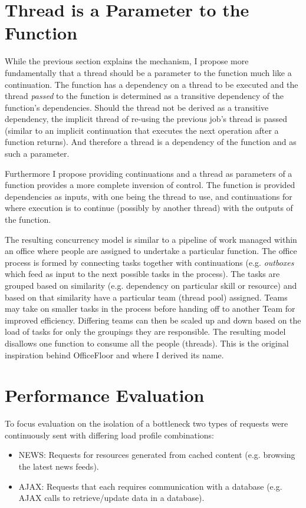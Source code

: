 \documentclass[conference]{ieee/IEEEtran}
\begin{document}
\section{Thread is a Parameter to the Function}
While the previous section explains the mechanism, I propose more fundamentally
that a thread should be a parameter to the function much like a continuation. 
The function has a dependency on a thread to be executed and the thread
\textit{passed} to the function is determined as a transitive dependency of the
function's dependencies.  Should the thread not be derived as a transitive
dependency, the implicit thread of re-using the previous job's thread is passed
(similar to an implicit continuation that executes the next operation after a
function returns).  And therefore a thread is a dependency of the function and
as such a parameter.

Furthermore I propose providing continuations and a thread as parameters of a
function provides a more complete inversion of control.  The function is
provided dependencies as inputs, with one being the thread to use, and
continuations for where execution is to continue (possibly by another thread)
with the outputs of the function.

The resulting concurrency model is similar to a pipeline of work managed within
an office where people are assigned to undertake a particular function.
The office process is formed by connecting tasks together with continuations
(e.g. \textit{outboxes} which feed as input to the next possible tasks in the
process).  The tasks are grouped based on similarity (e.g. dependency on
particular skill or resource) and based on that similarity have a particular
team (thread pool) assigned.  Teams may take on smaller tasks in the process
before handing off to another Team for improved efficiency.  Differing teams can
then be scaled up and down based on the load of tasks for only the groupings
they are responsible.  The resulting model disallows one function to consume all
the people (threads).  This is the original inspiration behind OfficeFloor and
where I derived its name.



\section{Performance Evaluation}
To focus evaluation on the isolation of a bottleneck two types of requests were
continuously sent with differing load profile combinations:
\begin{itemize}
\item NEWS: Requests for resources generated from cached content (e.g. browsing
the latest news feeds).
\item AJAX: Requests that each requires communication with a database (e.g.
AJAX calls to retrieve/update data in a database).
\end{itemize}
\end{document}
